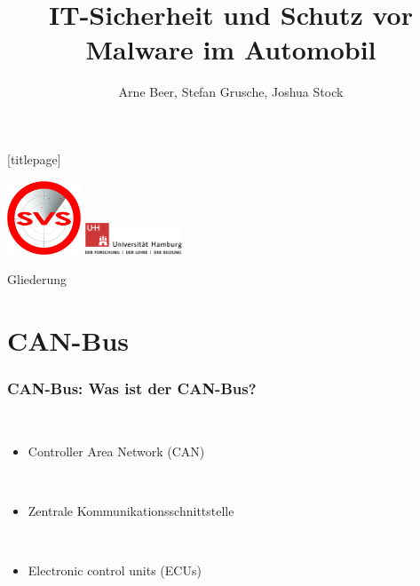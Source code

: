 \documentclass[t]{beamer}
\title{IT-Sicherheit und Schutz vor Malware im Automobil}
\author[Beer, Grusche, Stock]{Arne Beer, Stefan Grusche, Joshua Stock}
\date{}
\begin{document}
\begingroup
	[titlepage]
	\begin{frame}[plain]
		\vskip8mm
		\includegraphics[width=2.2cm]{pic/svs_logo_hires-ohne-was.png}
		\titlepage
		\vspace{\fill}
		\includegraphics[width=2.9cm]{pic/UHH-Logo_2010_Farbe_RGB_hires_nomargin.png}
		\vskip20pt
	\end{frame}
\endgroup

\begin{frame}{Gliederung}
	\tableofcontents
\end{frame}

\section{CAN-Bus}
\begin{frame}
	\frametitle{CAN-Bus: Was ist der CAN-Bus?}
    \ \par
	\begin{itemize}
        \item Controller Area Network (CAN)
   \end{itemize}
   \ \par
   \begin{itemize}
		\item Zentrale Kommunikationsschnittstelle
    \end{itemize}
   	\ \par
   	\begin{itemize}
        \item Electronic control units (ECUs)
	\end{itemize}
\end{frame}
\end{document}
